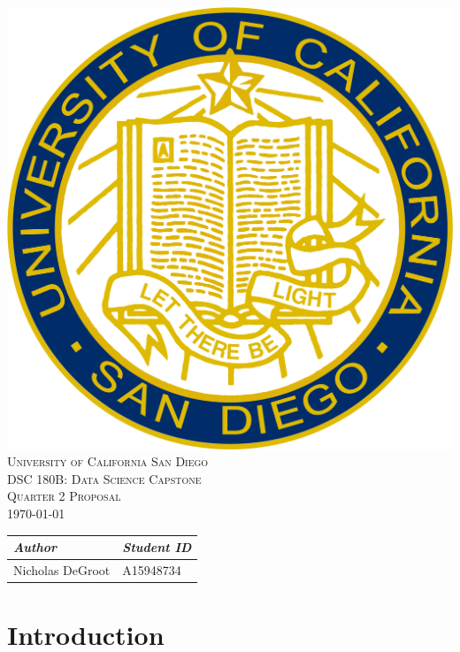 \documentclass{./styles/ucsdreport}
\def\course{DSC 180B: Data Science Capstone}
\def\thetitle{Quarter 2 Proposal}
\def\date{\today}
\begin{document}
\begin{center}
    \vspace*{1.5cm}
    \includegraphics[scale = 0.10]{ucsdseal.png}\\[1.75cm]
    \textsc{\color[RGB]{0, 51, 102}\LARGE{University of California San Diego}}\\[1cm]
    \textsc{\Large{\course}}\\[.5cm]
    \textsc{\Large{\thetitle}}\\[.5cm]
    \textsc{\date}\\[2cm]
    \Large{
        \begin{tabular}{L{4cm} R{4cm}}
            \textit{Author}  & \textit{Student ID} \\
            \hline
            Nicholas DeGroot & A15948734
        \end{tabular}
    }
\end{center}
\thispagestyle{empty}
\pagebreak

\tableofcontents{}
\pagebreak

\section{Introduction}
\end{document}
